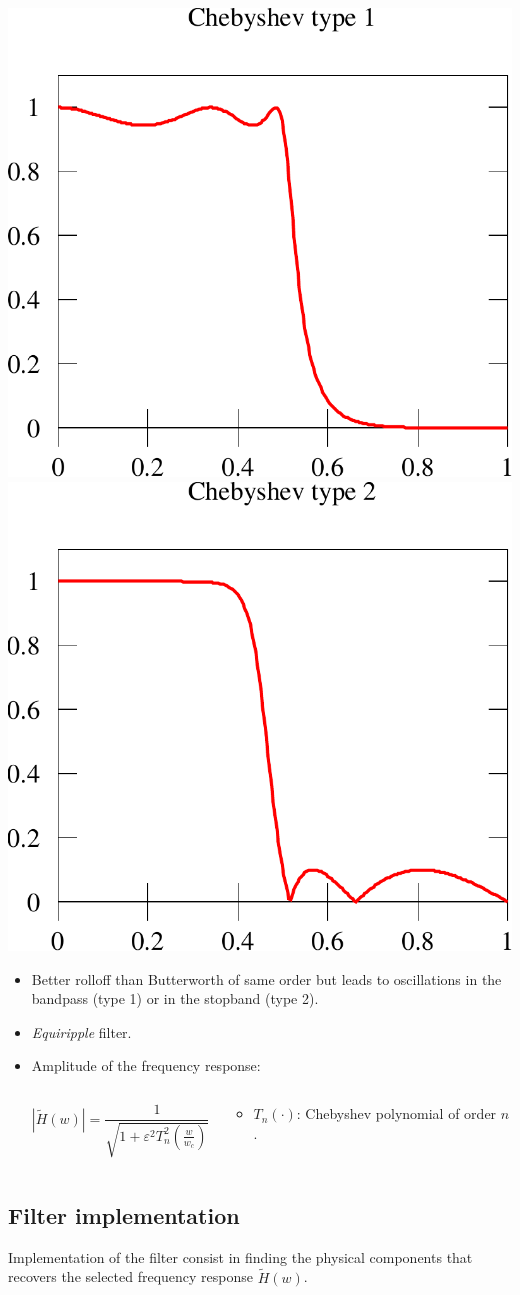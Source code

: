 \begin{center}
  \includegraphics[width=.35\columnwidth]{imgs/fourier/cheby1}\hspace{1cm}
  \includegraphics[width=.35\columnwidth]{imgs/fourier/cheby2}
\end{center}
\begin{itemize}
\item Better rolloff than Butterworth of same order but leads to oscillations in the bandpass (type 1) or in the stopband (type 2).
\item \emph{Equiripple} filter.
\item Amplitude of the frequency response:
 \begin{columns}
   \begin{column}{6cm}
$$  |\tilde H(w)|=\frac{1}{\sqrt{1+\varepsilon^2T_n^2\left(\frac{w}{w_c}\right)}}$$
\end{column}
\begin{column}{5cm}
\begin{itemize}
\item $T_n(\cdot)$: Chebyshev polynomial of order $n$.
\end{itemize}
\end{column}
\end{columns}

\end{itemize}
    

\subsection{Filter implementation}

 Implementation of the filter consist in finding the physical components that recovers the selected  frequency response $\tilde H(w)$.



